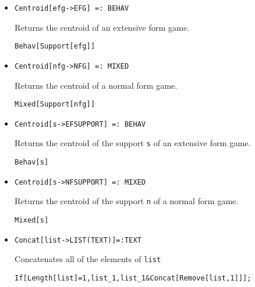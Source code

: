 \begin{itemize}
\item{}
\protect \large \begin{verbatim}
Centroid[efg->EFG] =: BEHAV 
\end{verbatim}\normalsize

\bd 
Returns the centroid of an extensive form game.  
\begin{verbatim}
Behav[Support[efg]]
\end{verbatim} 
\ed

\item{}
\protect \large \begin{verbatim}
Centroid[nfg->NFG] =: MIXED 
\end{verbatim}\normalsize

\bd 
Returns the centroid of a normal form game.  
\begin{verbatim}
Mixed[Support[nfg]]
\end{verbatim} 
\ed

\item{}
\protect \large \begin{verbatim}
Centroid[s->EFSUPPORT] =: BEHAV 
\end{verbatim}\normalsize

\bd 
Returns the centroid of the support \verb+s+ of an extensive form game.  
\begin{verbatim}
Behav[s]
\end{verbatim} 
\ed

\item{}
\protect \large \begin{verbatim}
Centroid[s->NFSUPPORT] =: MIXED 
\end{verbatim}\normalsize

\bd 
Returns the centroid of the support \verb+n+ of a normal form game.  
\begin{verbatim}
Mixed[s]
\end{verbatim} 
\ed

\item{}
\protect \large \begin{verbatim}
Concat[list->LIST(TEXT)]=:TEXT
\end{verbatim}\normalsize

\bd 
Concatenates all of the elements of \verb+list+
\begin{verbatim}
If[Length[list]=1,list_1,list_1&Concat[Remove[list,1]]];
\end{verbatim} 
\ed




\end{itemize}
